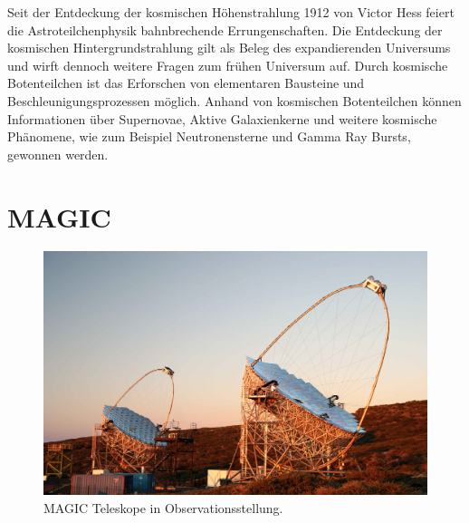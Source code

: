 Seit der Entdeckung der kosmischen Höhenstrahlung
1912 von Victor Hess feiert die Astroteilchenphysik bahnbrechende Errungenschaften.
Die Entdeckung der kosmischen Hintergrundstrahlung gilt als Beleg des
expandierenden Universums und wirft dennoch weitere Fragen zum frühen Universum auf.
Durch kosmische Botenteilchen ist das Erforschen von elementaren Bausteine und
Beschleunigungsprozessen möglich.
Anhand von kosmischen Botenteilchen können Informationen über Supernovae,
Aktive Galaxienkerne und weitere kosmische Phänomene, wie zum Beispiel
Neutronensterne und Gamma Ray Bursts, gewonnen werden.

\section*{MAGIC}%
\label{sec:magic}

\begin{figure}
		\includegraphics[width=\linewidth]{pictures/magic.JPG}
		\caption{MAGIC Teleskope in Observationsstellung.}%
		\label{fig:magic}
\end{figure}

